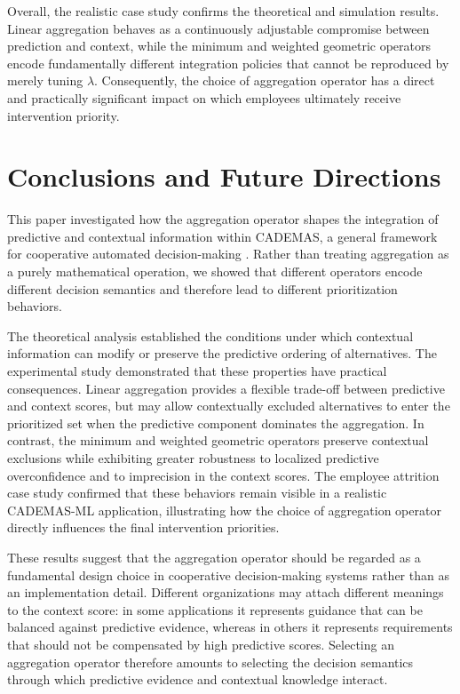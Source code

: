 \documentclass[mathematics,article,submit,moreauthors]{Definitions/mdpi}
\begin{document}
Overall, the realistic case study confirms the theoretical and simulation results. Linear aggregation behaves as a continuously adjustable compromise between prediction and context, while the minimum and weighted geometric operators encode fundamentally different integration policies that cannot be reproduced by merely tuning $\lambda$. Consequently, the choice of aggregation operator has a direct and practically significant impact on which employees ultimately receive intervention priority.

\section{Conclusions and Future Directions}\label{sect:conclusions}

This paper investigated how the aggregation operator shapes the integration of predictive and contextual information within CADEMAS, a general framework for cooperative automated decision-making \citep{NovoaHernandez2026}. Rather than treating aggregation as a purely mathematical operation, we showed that different operators encode different decision semantics and therefore lead to different prioritization behaviors.

The theoretical analysis established the conditions under which contextual information can modify or preserve the predictive ordering of alternatives. The experimental study demonstrated that these properties have practical consequences. Linear aggregation provides a flexible trade-off between predictive and context scores, but may allow contextually excluded alternatives to enter the prioritized set when the predictive component dominates the aggregation. In contrast, the minimum and weighted geometric operators preserve contextual exclusions while exhibiting greater robustness to localized predictive overconfidence and to imprecision in the context scores. The employee attrition case study confirmed that these behaviors remain visible in a realistic CADEMAS-ML application, illustrating how the choice of aggregation operator directly influences the final intervention priorities.

These results suggest that the aggregation operator should be regarded as a fundamental design choice in cooperative decision-making systems rather than as an implementation detail. Different organizations may attach different meanings to the context score: in some applications it represents guidance that can be balanced against predictive evidence, whereas in others it represents requirements that should not be compensated by high predictive scores. Selecting an aggregation operator therefore amounts to selecting the decision semantics through which predictive evidence and contextual knowledge interact.
\end{document}
